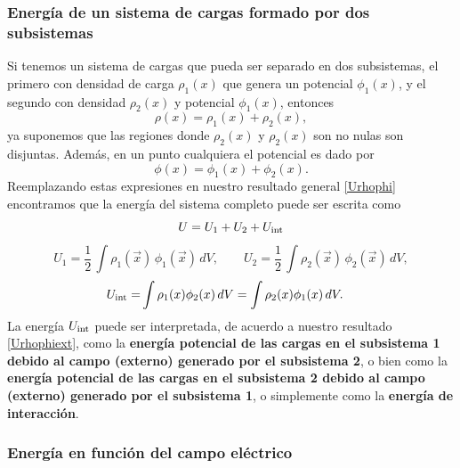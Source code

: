 \subsubsection{Energía de un sistema de cargas formado por dos subsistemas}
Si tenemos un sistema de cargas que pueda ser separado en dos subsistemas, el primero con densidad de carga $\rho_1(x)$ que genera un potencial $\phi_1(x)$, y el segundo con densidad $\rho_2(x)$ y potencial $\phi_1(x)$, entonces 
\begin{equation}
\rho(x)=\rho_1(x)+\rho_2(x),
\end{equation}
ya suponemos que las regiones donde $\rho_2(x)$ y $\rho_2(x)$ son no nulas son disjuntas. Además, en un punto cualquiera el potencial es dado por
\begin{equation}
\phi(x)=\phi_1(x)+\phi_2(x).
\end{equation}
Reemplazando estas expresiones en nuestro resultado general \eqref{Urhophi} encontramos que  la energía del sistema completo puede ser escrita como
\begin{equation}
U=U_1+U_2+U_{\rm int}
\end{equation}
\begin{equation}
U_1= \frac{1}{2}\,\int\rho_1(\vec{x})\,\phi_1(\vec{x})\,dV ,\qquad U_2= \frac{1}{2}\,\int\rho_2(\vec{x})\,\phi_2(\vec{x})\,dV,
\end{equation}
\begin{align}
U_{\rm int} =& \int \rho_1(x)\phi_2(x)\,dV = \int \rho_2(x)\phi_1(x)\,dV.
\end{align}
La energía $U_{\rm int}$ puede ser interpretada, de acuerdo a nuestro resultado \eqref{Urhophiext}, como la \textbf{energía potencial de las cargas en el subsistema 1 debido al campo (externo) generado por el subsistema 2}, o bien como la \textbf{energía potencial de las cargas en el subsistema 2 debido al campo (externo) generado por el subsistema 1}, o simplemente como la \textbf{energía de interacción}.


\subsubsection{Energía en función del campo eléctrico}

